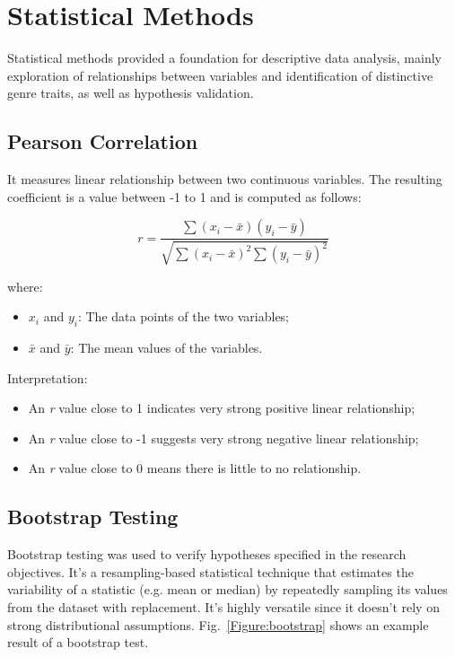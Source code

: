 \section{Statistical Methods}
\label{sec:statisticalmethods}

Statistical methods provided a foundation for descriptive data analysis, mainly
exploration of relationships between variables and identification of distinctive
genre traits, as well as hypothesis validation.

\subsection{Pearson Correlation}

It measures linear relationship between two continuous variables. The resulting
coefficient is a value between -1 to 1 and is computed as follows: 

\[
r = \frac{\sum{(x_i - \bar{x})(y_i - \bar{y})}}{\sqrt{\sum{(x_i - \bar{x})^2} \sum{(y_i - \bar{y})^2}}}
\]

\noindent \noindent where:
\begin{itemize}
    \item \( x_i \) and \( y_i \): The data points of the two variables;
    \item \( \bar{x} \) and \( \bar{y} \): The mean values of the variables.
\end{itemize}

\noindent \noindent Interpretation:
\begin{itemize}
  \item An \textit{r} value close to 1 indicates very strong positive linear
    relationship;
  \item An \textit{r} value close to -1 suggests very strong negative linear
    relationship;
  \item An \textit{r} value close to 0 means there is little to no relationship.
\end{itemize}



\subsection{Bootstrap Testing}

Bootstrap testing was used to verify hypotheses specified in the research
objectives. It's a resampling-based statistical technique that estimates the
variability of a statistic (e.g. mean or median)  by repeatedly sampling its
values from the dataset with replacement. It's highly versatile since it
doesn't rely on strong distributional assumptions. Fig.~\ref{Figure:bootstrap}
shows an example result of a bootstrap test.


